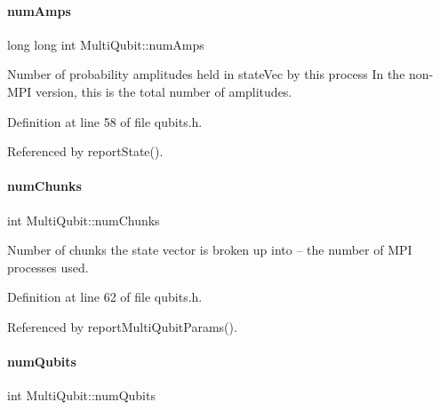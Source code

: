\mbox{\label{structMultiQubit_ae16f47d8b725c914fb7f66b6498d79db}} 
\paragraph{\texorpdfstring{num\+Amps}{numAmps}}
{\footnotesize\ttfamily long long int Multi\+Qubit\+::num\+Amps}



Number of probability amplitudes held in state\+Vec by this process In the non-\/\+M\+PI version, this is the total number of amplitudes. 



Definition at line 58 of file qubits.\+h.



Referenced by report\+State().

\mbox{\label{structMultiQubit_acd43f2f57991709c9e94f73662c972b2}} 
\paragraph{\texorpdfstring{num\+Chunks}{numChunks}}
{\footnotesize\ttfamily int Multi\+Qubit\+::num\+Chunks}



Number of chunks the state vector is broken up into -- the number of M\+PI processes used. 



Definition at line 62 of file qubits.\+h.



Referenced by report\+Multi\+Qubit\+Params().

\mbox{\label{structMultiQubit_ab5b9795bdc6fb5855e1974dcbbaeb36f}} 
\paragraph{\texorpdfstring{num\+Qubits}{numQubits}}
{\footnotesize\ttfamily int Multi\+Qubit\+::num\+Qubits}



